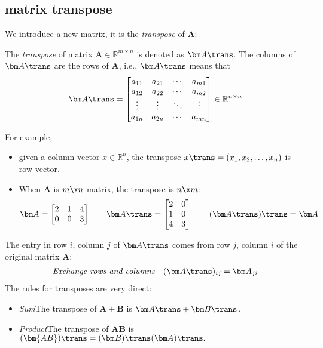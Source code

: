 \subsection{matrix transpose}
We introduce a new matrix, it is the \emph{transpose} of $\bm A$:
\begin{definition}[Transpose]
The \emph{transpose} of matrix $\bm A\in\mathbb{R}^{m\times n}$ is denoted as $\bm A\trans$. The columns of $\bm A\trans$ are the rows of $\bm A$, i.e., $\bm A\trans$ means that
\[
\bm A\trans=\begin{bmatrix}
a_{11}&a_{21}&\cdots&a_{m1}\\
a_{12}&a_{22}&\cdots&a_{m2}\\
\vdots&\vdots&\ddots&\vdots\\
a_{1n}&a_{2n}&\cdots&a_{mn}\\
\end{bmatrix}\in\mathbb{R}^{n\times n}
\]
\end{definition}

For example, 
\begin{itemize}
\item
given a column vector $x\in \mathbb{R}^{n}$, the transpose $x\trans = (x_1,x_2,\dots,x_n)$ is row vector.
\item
When $\bm A$ is $m\x n$ matrix, the transpose is $n\x m$:
\[
\bm A = \begin{bmatrix}
2 & 1 & 4\\0 &0 &3
\end{bmatrix}\qquad \bm A\trans = \begin{bmatrix}
2&0\\1&0\\4&3
\end{bmatrix}\qquad (\bm A\trans)\trans = \bm A
\] 
\end{itemize}
The entry in row $i$, column $j$ of $\bm A\trans$ comes from row $j$, column $i$ of the original matrix $\bm A$:
\[
\begin{array}{ll}
\mbox{\emph{Exchange rows and columns}}
&
(\bm A\trans)_{ij} = \bm A_{ji}
\end{array}
\]
The rules for transposes are very direct:
\begin{proposition}
\begin{itemize}
\item
\emph{Sum}\qquad The transpose of $\bm A+\bm B$ is $\bm A\trans + \bm B\trans$.
\item
\emph{Product}\qquad The transpose of $\bm{AB}$ is $(\bm{AB})\trans = (\bm B)\trans(\bm A)\trans.$
\end{itemize}
\end{proposition}
\newpage

